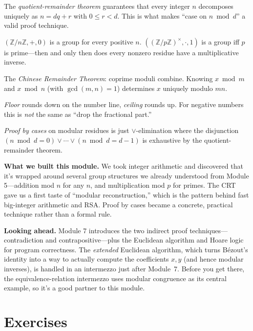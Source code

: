 \documentclass[11pt]{article}
\begin{document}
\begin{keytakeaway}
  \item The \emph{quotient-remainder theorem} guarantees that every integer $n$ decomposes uniquely as $n = dq + r$ with $0 \leq r < d$. This is what makes ``case on $n \bmod d$'' a valid proof technique.
  \item $(\mathbb{Z}/n\mathbb{Z}, +, 0)$ is a group for every positive $n$. $((\mathbb{Z}/p\mathbb{Z})^{\times}, \cdot, 1)$ is a group iff $p$ is prime---then and only then does every nonzero residue have a multiplicative inverse.
  \item The \emph{Chinese Remainder Theorem}: coprime moduli combine. Knowing $x \bmod m$ and $x \bmod n$ (with $\gcd(m,n) = 1$) determines $x$ uniquely modulo $mn$.
  \item \emph{Floor} rounds down on the number line, \emph{ceiling} rounds up. For negative numbers this is \emph{not} the same as ``drop the fractional part.''
  \item \emph{Proof by cases} on modular residues is just $\vee$-elimination where the disjunction $(n \bmod d = 0) \vee \cdots \vee (n \bmod d = d-1)$ is exhaustive by the quotient-remainder theorem.
\end{keytakeaway}

\begin{summarybox}
\textbf{What we built this module.} We took integer arithmetic and discovered that it's wrapped around several group structures we already understood from Module 5---addition mod $n$ for any $n$, and multiplication mod $p$ for primes. The CRT gave us a first taste of ``modular reconstruction,'' which is the pattern behind fast big-integer arithmetic and RSA. Proof by cases became a concrete, practical technique rather than a formal rule.

\medskip
\textbf{Looking ahead.} Module 7 introduces the two indirect proof techniques---contradiction and contrapositive---plus the Euclidean algorithm and Hoare logic for program correctness. The \emph{extended} Euclidean algorithm, which turns B\'ezout's identity into a way to actually compute the coefficients $x, y$ (and hence modular inverses), is handled in an intermezzo just after Module~7. Before you get there, the equivalence-relation intermezzo uses modular congruence as its central example, so it's a good partner to this module.
\end{summarybox}

\section{Exercises}
\end{document}
